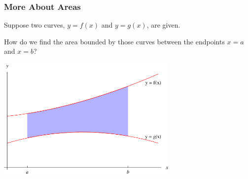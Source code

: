 \begin{frame}
\frametitle{More About Areas}
Suppose two curves, $y = f(x)$ and $y = g(x)$, are given.

How do we find the area bounded by those curves between the endpoints $x = a$ and $x = b$?

\includegraphics[height=6cm]{area-between-curves/pictures/06-01-doubleint.pdf}
\end{frame}
